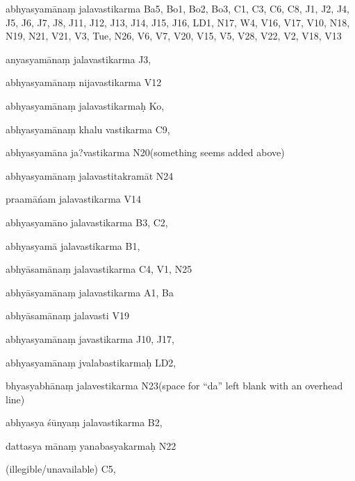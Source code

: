 \begin{ekdosis}
\begin{marma}[hp01_055]
\begin{marma}[hp02_009]
\begin{marma}[hp02_011]
\begin{marma}[hp02_29d]
\item[abhyasyamānaṃ jalavastikarma] Ba5, Bo1, Bo2, Bo3, C1, C3, C6, C8, J1, J2, J4, J5, J6, J7, J8, J11, J12, J13, J14, J15, J16, LD1, N17, W4, V16, V17, V10, N18, N19, N21, V21, V3, Tue, N26, V6, V7, V20, V15, V5, V28, V22, V2, V18, V13
\item[anyasyamānaṃ jalavastikarma] J3,
\item[abhyasyamānaṃ nijavastikarma] V12
\item[abhyasyamānaṃ jalavastikarmaḥ] Ko,
\item[abhyasyamānaṃ khalu vastikarma] C9,
\item[abhyasyamāna ja?vastikarma] N20(something seems added above)
\item[abhyasyamānaṃ jalavastitakramāt] N24
\item[praamāńam jalavastikarma] V14
\item[abhyasyamāno jalavastikarma] B3, C2, 
\item[abhyasyamā jalavastikarma] B1,
\item[abhyāsamānaṃ jalavastikarma] C4, V1, N25
\item[abhyāsyamānaṃ jalavastikarma] A1, Ba
\item[abhyāsamānaṃ jalavasti] V19
\item[abhyasyamānaṃ javastikarma] J10, J17,
\item[abhyasyamānaṃ jvalabastikarmaḥ] LD2,
\item[bhyasyabhānaṃ jalavestikarma] N23(space for “da” left blank with an overhead line)
\item[abhyasya śūnyaṃ jalavastikarma] B2,
\item[dattasya mānaṃ yanabasyakarmaḥ] N22
\item[(illegible/unavailable)] C5,
 \begin{description}

        \end{description}
\end{marma}


\end{marma}
\end{marma}
\end{marma}
\end{ekdosis}
